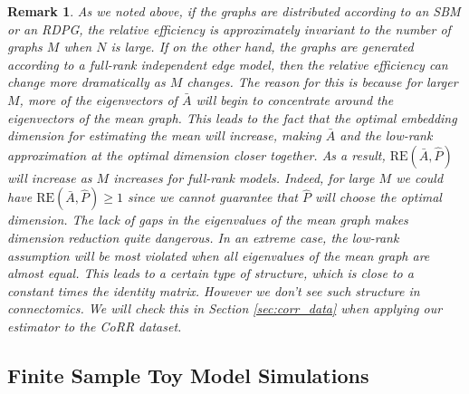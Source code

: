 \documentclass[10pt,letterpaper]{article}
\newtheorem{remark}[fact]{Remark}
\renewcommand{\hat}{\widehat}
\begin{document}
\begin{remark}\label{remark:low_rank}
As we noted above, if the graphs are distributed according to an SBM or an RDPG, the relative efficiency is approximately invariant to the number of graphs $M$ when $N$ is large.
If on the other hand, the graphs are generated according to a full-rank independent edge model, then the relative efficiency can change more dramatically as $M$ changes. 
The reason for this is because for larger $M$, more of the eigenvectors of $\bar{A}$ will begin to concentrate around the eigenvectors of the mean graph.
This leads to the fact that the optimal embedding dimension for estimating the mean will increase, making $\bar{A}$ and the low-rank approximation at the optimal dimension closer together. 
As a result, $\mathrm{RE}(\bar{A},\hat{P})$ will increase as $M$ increases for full-rank models.
Indeed, for large $M$ we could have $\mathrm{RE}(\bar{A},\hat{P})\geq 1$ since we cannot guarantee that $\hat{P}$ will choose the optimal dimension.
The lack of gaps in the eigenvalues of the mean graph makes dimension reduction quite dangerous.
In an extreme case, the low-rank assumption will be most violated when all eigenvalues of the mean graph are almost equal. This leads to a certain type of structure, which is close to a constant times the identity matrix. However we don't see such structure in connectomics.
We will check this in Section \ref{sec:corr_data} when applying our estimator to the CoRR dataset.
\end{remark}

\subsection{Finite Sample Toy Model Simulations}\label{sec:sbm_sim}
\end{document}
